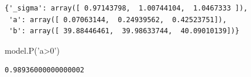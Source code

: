 \documentclass[]{article}
\newenvironment{Shaded}{}{}
\newcommand{\StringTok}[1]{\textcolor[rgb]{0.25,0.44,0.63}{{#1}}}
\newcommand{\NormalTok}[1]{{#1}}
\begin{document}
\begin{verbatim}
{'_sigma': array([ 0.97143798,  1.00744104,  1.0467333 ]),
 'a': array([ 0.07063144,  0.24939562,  0.42523751]),
 'b': array([ 39.88446461,  39.98633744,  40.09010139])}
\end{verbatim}

\begin{Shaded}
\begin{Highlighting}[]
\NormalTok{model.P(}\StringTok{'a>0'}\NormalTok{)}
\end{Highlighting}
\end{Shaded}

\begin{verbatim}
0.98936000000000002
\end{verbatim}

\begin{Shaded}
\begin{Highlighting}[]

\end{Highlighting}
\end{Shaded}
\end{document}
